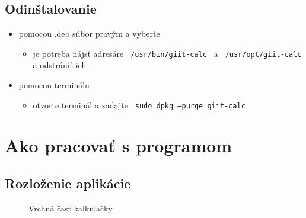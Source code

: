 \documentclass[a4paper, 11pt]{article}
\begin{document}
    \subsection{Odinštalovanie}
    \begin{itemize}
        \item pomocou .deb súbor pravým a vyberte
        \begin{itemize}
            \item je potreba nájsť adresáre \texttt{ /usr/bin/giit-calc } a \texttt{ /usr/opt/giit-calc }a odstrániť ich
        \end{itemize}
        \item pomocou terminálu
        \begin{itemize}
            \item otvorte terminál a zadajte \texttt{ sudo dpkg --purge giit-calc }
        \end{itemize}
    \end{itemize}
    \newpage
    \section{Ako pracovať s programom}
    \subsection{Rozloženie aplikácie}
    \begin{figure}[!h]
        \centering
        \caption{Vrchná časť kalkulačky}
        \label{fig:obrazok1}
    \end{figure}
    
\end{document}
